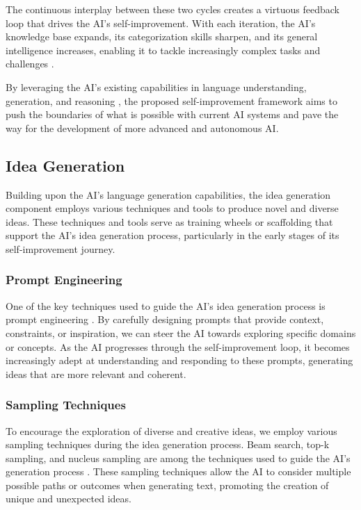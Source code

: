 \documentclass[conference]{article}
\begin{document}
	
	
	The continuous interplay between these two cycles creates a virtuous feedback loop that drives the AI's self-improvement. With each iteration, the AI's knowledge base expands, its categorization skills sharpen, and its general intelligence increases, enabling it to tackle increasingly complex tasks and challenges \cite{chollet2019measure, silver2021reward}.
	
	By leveraging the AI's existing capabilities in language understanding, generation, and reasoning \cite{brown2020language, devlin2019bert}, the proposed self-improvement framework aims to push the boundaries of what is possible with current AI systems and pave the way for the development of more advanced and autonomous AI.
	
	\subsection{Idea Generation}
	Building upon the AI's language generation capabilities, the idea generation component employs various techniques and tools to produce novel and diverse ideas. These techniques and tools serve as training wheels or scaffolding that support the AI's idea generation process, particularly in the early stages of its self-improvement journey.
	
	
	\subsubsection{Prompt Engineering}
	One of the key techniques used to guide the AI's idea generation process is prompt engineering \cite{liu2021pre}. By carefully designing prompts that provide context, constraints, or inspiration, we can steer the AI towards exploring specific domains or concepts. As the AI progresses through the self-improvement loop, it becomes increasingly adept at understanding and responding to these prompts, generating ideas that are more relevant and coherent.
	
	\subsubsection{Sampling Techniques}
	To encourage the exploration of diverse and creative ideas, we employ various sampling techniques during the idea generation process. Beam search, top-k sampling, and nucleus sampling are among the techniques used to guide the AI's generation process \cite{holtzman2020curious}. These sampling techniques allow the AI to consider multiple possible paths or outcomes when generating text, promoting the creation of unique and unexpected ideas. 
	
\end{document}
